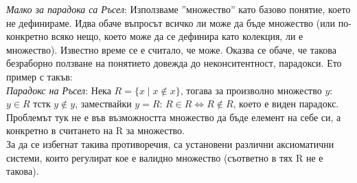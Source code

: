 \documentclass[10pt, a4paper]{article}
\theoremstyle{definition}
\theoremstyle{remark}
\begin{document}
\begin{flushleft}
    \emph{Малко за парадока са Ръсел}: Използваме ''множество'' като базово понятие, което не дефинираме. Идва обаче въпросът всичко ли може да бъде множество (или по-конкретно всяко нещо, което може да се дефинира като колекция, ли е множество). Известно време се е считало, че може. Оказва се обаче, че такова безраборно ползване на понятието довежда до неконситентност, парадокси. Ето пример с такъв:\\
    \emph{Парадокс на Ръсел}: Нека $R=\{x\;|\;x\notin x\}$, тогава за произволно множество $y$: $y\in R$ тстк $y\notin y$, замествайки $y=R$:
     $R\in R \Leftrightarrow R\notin R$, което е виден парадокс. Проблемът тук не е във възможността множество да бъде елемент на себе си, а конкретно в считането на R за множество.\\
    За да се избегнат такива противоречия, са установени различни аксиоматични системи, които регулират кое е валидно множество (съответно в тях R не е такова).    
\end{flushleft}
\end{document}
